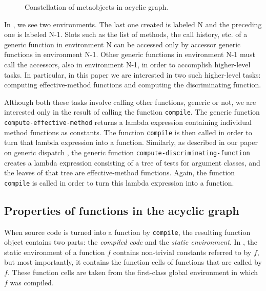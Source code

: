 \begin{figure}
\begin{center}
\end{center}
\caption{\label{fig-constellation}
Constellation of metaobjects in acyclic graph.}
\end{figure}

In , we see two environments.  The last one
created is labeled N and the preceding one is labeled N-1.  Slots such
as the list of methods, the call history, etc. of a generic function
in environment N can be accessed only by accessor generic functions in
environment N-1.  Other generic functions in environment N-1 must call
the accessors, also in environment N-1, in order to accomplish
higher-level tasks.  In particular, in this paper we are interested in
two such higher-level tasks: computing effective-method functions and
computing the discriminating function.

Although both these tasks involve calling other functions, generic or
not, we are interested only in the result of calling the function
\texttt{compile}.  The generic function
\texttt{compute-effective-method} returns a lambda expression
containing individual method functions as constants.  The function
\texttt{compile} is then called in order to turn that lambda
expression into a function.  Similarly, as described in our paper on
generic dispatch \cite{Strandh:2014:FGD:2635648.2635654}, the generic
function \texttt{compute-discriminating-function} creates  a lambda
expression consisting of a tree of tests for argument classes, and the
leaves of that tree are effective-method functions.  Again, the
function \texttt{compile} is called in order to turn this lambda
expression into a function.

\subsection{Properties of functions in the acyclic graph}

When source code is turned into a function by \texttt{compile}, the
resulting function object contains two parts: the
\emph{compiled code} and the \emph{static environment}.  In \sicl{},
the static environment of a function $f$ contains non-trivial
constants referred to by $f$, but most importantly, it contains the
function cells of functions that are called by $f$.  These function
cells are taken from the first-class global environment in which $f$
was compiled.

